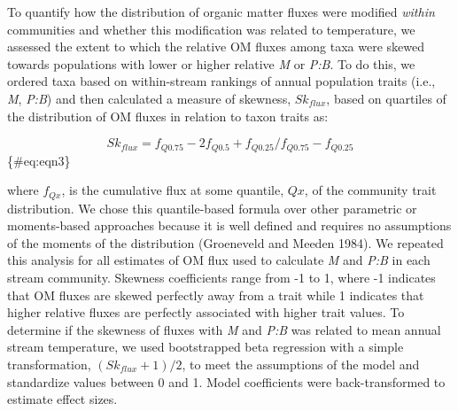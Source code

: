 \documentclass[
]{article}
\numberwithin{equation}
\begin{document}
To quantify how the distribution of organic matter fluxes were modified
\emph{within} communities and whether this modification was related to
temperature, we assessed the extent to which the relative OM fluxes
among taxa were skewed towards populations with lower or higher relative
\emph{M} or \emph{P:B}. To do this, we ordered taxa based on
within-stream rankings of annual population traits (i.e., \emph{M},
\emph{P:B}) and then calculated a measure of skewness, \(Sk_{flux}\),
based on quartiles of the distribution of OM fluxes in relation to taxon
traits as:

\[Sk_{flux} = f_{Q0.75} - 2f_{Q0.5} + f_{Q0.25}/ f_{Q0.75}-f_{Q0.25}\]
\{\#eq:eqn3\}

where \(f_{Qx}\), is the cumulative flux at some quantile, \(Qx\), of
the community trait distribution. We chose this quantile-based formula
over other parametric or moments-based approaches because it is well
defined and requires no assumptions of the moments of the distribution
(Groeneveld and Meeden 1984). We repeated this analysis for all
estimates of OM flux used to calculate \emph{M} and \emph{P:B} in each
stream community. Skewness coefficients range from -1 to 1, where -1
indicates that OM fluxes are skewed perfectly away from a trait while 1
indicates that higher relative fluxes are perfectly associated with
higher trait values. To determine if the skewness of fluxes with
\emph{M} and \emph{P:B} was related to mean annual stream temperature,
we used bootstrapped beta regression with a simple transformation,
\((Sk_{flux} + 1)/2\), to meet the assumptions of the model and
standardize values between 0 and 1. Model coefficients were
back-transformed to estimate effect sizes.
\end{document}
